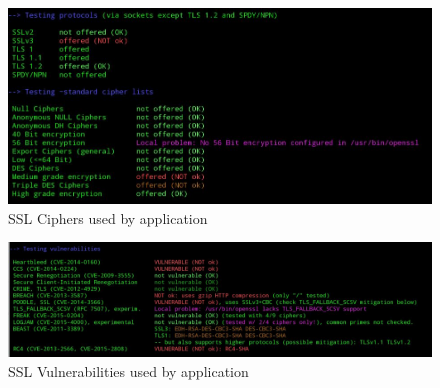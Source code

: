 	\begin{figure}[h!tbp]
		\centering
		\includegraphics[width=\textwidth]{figures/t07_ssl_cipher.png}
		\caption{SSL Ciphers used by \bs application}
		\label{figure:bs_ssl_cipher}
	\end{figure}
	\begin{figure}[h!tbp]
		\centering
		\includegraphics[width=\textwidth]{figures/t07_ssl_vuln.png}
		\caption{SSL Vulnerabilities used by \bs application}
		\label{figure:bs_ssl_vuln}
	\end{figure}

